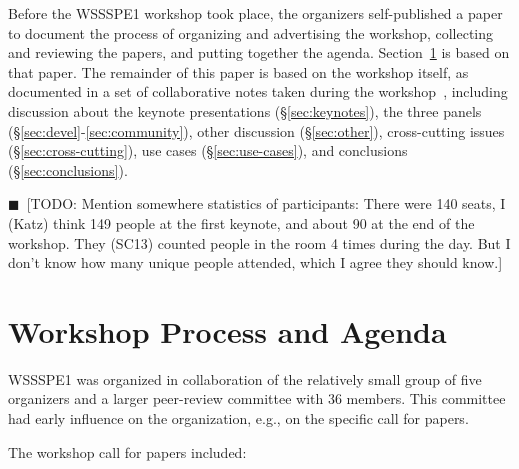 \documentclass[11pt, oneside]{amsart}
\newcommand{\todo}[1]{{\color{blue}$\blacksquare$~\textsf{[TODO: #1]}}}
\begin{document}
Before the WSSSPE1 workshop took place, the organizers self-published
a paper~\cite{WSSSPE1-pre-report} to document the process of
organizing and advertising the workshop, collecting and reviewing the
papers, and putting together the agenda.  Section~\ref{sec:process} is
based on that paper. The remainder of this paper is based on the
workshop itself, as documented in a set of collaborative notes taken
during the workshop~\cite{WSSSPE1-google-notes}, including discussion
about the keynote presentations (\S\ref{sec:keynotes}), the three
panels (\S\ref{sec:devel}-\ref{sec:community}), other discussion
(\S\ref{sec:other}), cross-cutting issues (\S\ref{sec:cross-cutting}),
use cases (\S\ref{sec:use-cases}), and conclusions
(\S\ref{sec:conclusions}).

\todo{Mention somewhere statistics of participants: There were 140 seats, I (Katz) think 149 people at the first keynote, and about 90 at the end of the workshop.  They (SC13) counted people in the room 4 times during the day.  But I don’t know how many unique people attended, which I agree they should know.}

\section{Workshop Process and Agenda} \label{sec:process}

WSSSPE1 was organized in collaboration of the relatively small group
of five organizers and a larger peer-review committee with 36
members. This committee had early influence on the organization, e.g.,
on the specific call for papers.

The workshop call for papers included:
\end{document}
